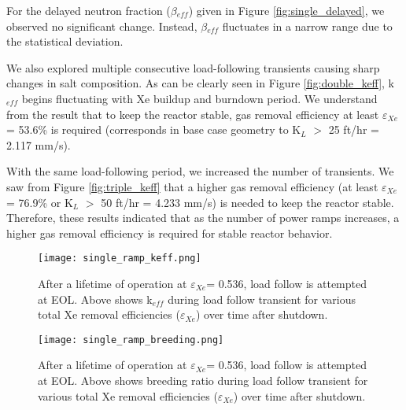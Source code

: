     For the delayed neutron fraction ($\beta$$_{eff}$) given in Figure 
    \ref{fig:single_delayed}, we observed no significant change. Instead, 
    $\beta$$_{eff}$ fluctuates in a narrow range due to the statistical 
    deviation.

    We also explored multiple consecutive load-following transients causing sharp 
    changes in salt composition. As can be clearly seen in Figure 
    \ref{fig:double_keff}, k$_{eff}$ begins fluctuating with Xe buildup and 
    burndown period. We understand from the result that to keep the reactor 
    stable, gas removal efficiency at least $\varepsilon$$_{Xe}$ = 53.6\% is 
    required (corresponds in base case geometry to K$_{L}$ $>$ 25 ft/hr = 2.117 
    mm/s).

    With the same load-following period, we increased the number of transients. We 
    saw from Figure \ref{fig:triple_keff} that a higher gas removal efficiency 
    (at least $\varepsilon$$_{Xe}$ = 76.9\% or K$_{L}$ $>$ 50 ft/hr = 4.233 
    mm/s) is needed to keep the reactor stable. Therefore, these results 
    indicated that as the number of power ramps increases, a higher gas removal 
    efficiency is required for stable reactor behavior.

    \begin{figure}[htbp!]
        \begin{center}
            \texttt{[image: single\_ramp\_keff.png]}
        \end{center}
        \caption{After a lifetime of operation at $\varepsilon$$_{Xe}$= 0.536, 
            load follow is attempted at EOL. Above shows k$_{eff}$ during load 
            follow transient for various total Xe removal efficiencies
        ($\varepsilon$$_{Xe}$) over time after shutdown.}
        \label{fig:single_keff}
    \end{figure}

    \begin{figure}[htbp!]
        \begin{center}
            \texttt{[image: single\_ramp\_breeding.png]}
        \end{center}
        \caption{After a lifetime of operation at $\varepsilon$$_{Xe}$= 0.536, 
            load follow is attempted at EOL. Above shows breeding ratio during 
            load
        follow transient for various total Xe removal efficiencies
        ($\varepsilon$$_{Xe}$) over time after shutdown.}
        \label{fig:single_breed}
    \end{figure}

